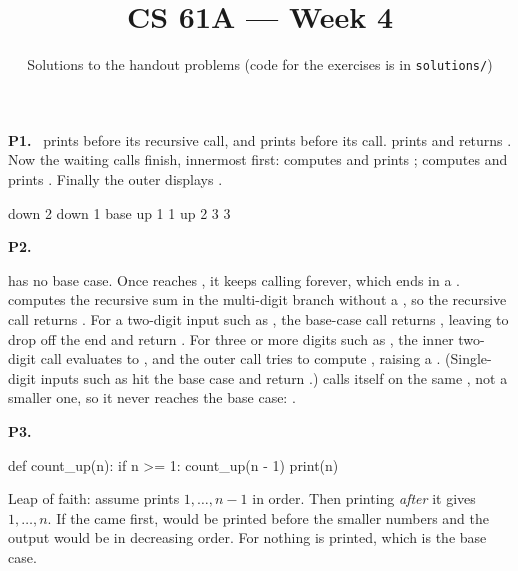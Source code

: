 \documentclass[10pt]{scrartcl}
\title{CS 61A --- Week 4}
\subtitle{Solutions to the handout problems (code for the exercises is in \texttt{solutions/})}
\author{}\date{}\ihead{}
\begin{document}
\maketitle

\begin{prob}\textbf{P1.}\  prints  before its recursive call, and  prints  before its call.  prints  and returns . Now the waiting calls finish, innermost first:  computes  and prints ;  computes  and prints . Finally the outer  displays .
\begin{plain}
down 2
down 1
base
up 1 1
up 2 3
3
\end{plain}
\end{prob}

\begin{prob}\textbf{P2.}
\begin{steps}
  \ii {} has no base case. Once  reaches , it keeps calling  forever, which ends in a .
  \ii {} computes the recursive sum in the multi-digit branch without a , so the recursive call returns . For a two-digit input such as , the base-case call  returns , leaving  to drop off the end and return . For three or more digits such as , the inner two-digit call  evaluates to , and the outer call tries to compute , raising a . (Single-digit inputs such as  hit the base case and return .)
  \ii {} calls itself on the same , not a smaller one, so it never reaches the base case: .
\end{steps}
\end{prob}

\begin{prob}\textbf{P3.}
\begin{py}
def count_up(n):
    if n >= 1:
        count_up(n - 1)
        print(n)
\end{py}
Leap of faith: assume  prints $1,\dots,n-1$ in order. Then printing  \emph{after} it gives $1,\dots,n$. If the  came first,  would be printed before the smaller numbers and the output would be in decreasing order. For  nothing is printed, which is the base case.
\end{prob}
\end{document}

